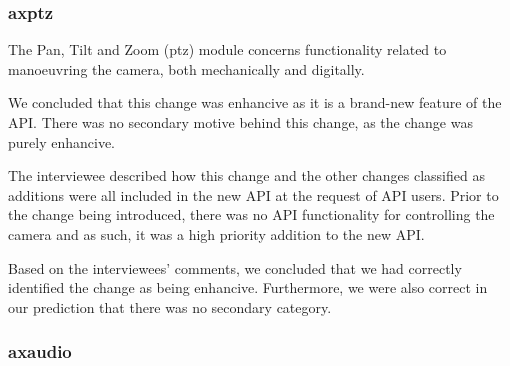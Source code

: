 \documentclass{sig-alternate}
\begin{document}




\subsubsection{axptz}
The Pan, Tilt and Zoom (ptz) module concerns functionality related to manoeuvring the camera, both mechanically and digitally. 

We concluded that this change was enhancive as it is a brand-new feature of the API. There was no secondary motive behind this change, as the change was purely enhancive. 


The interviewee described how this change and the other changes classified as additions were all included in the new API at the request of API users. Prior to the change being introduced, there was no API functionality for controlling the camera and as such, it was a high priority addition to the new API. 

Based on the interviewees' comments, we concluded that we had correctly identified the change as being enhancive. Furthermore, we were also correct in our prediction that there was no secondary category. 

\subsubsection{axaudio}
\end{document}

